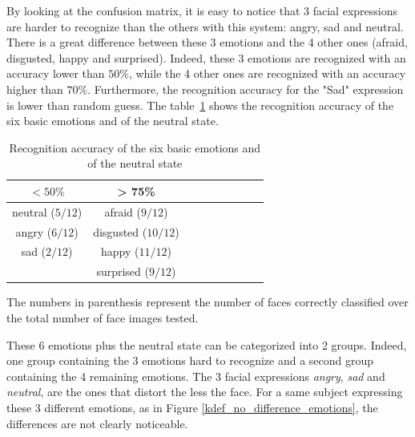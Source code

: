\noindent By looking at the confusion matrix, it is easy to notice that 3 facial expressions are harder to recognize than the others with this system: angry, sad and neutral. There is a great difference between these 3 emotions and the 4 other ones (afraid, disgusted, happy and surprised). Indeed, these 3 emotions are recognized with an accuracy lower than $ 50\% $, while the 4 other ones are recognized with an accuracy higher than $ 70\% $. Furthermore, the recognition accuracy for the "Sad" expression is lower than random guess. The table~\ref{table_results_accuracy} shows the recognition accuracy of the six basic emotions and of the neutral state.
\newline

\begin{table}[h]
   \caption{\label{table_results_accuracy} Recognition accuracy of the six basic emotions and of the neutral state}
\begin{tabular}{|c|c|c|c|c|c|c|c|c|}
  \hline
   $ < 50\% $ & > 75\% \\
  \hline
  neutral ($ 5/12 $) & afraid ($ 9/12 $) \\
  angry ($ 6/12 $) & disgusted ($ 10/12 $) \\
  sad ($ 2/12 $) & happy ($ 11/12 $) \\
   & surprised ($ 9/12 $) \\
  \hline
\end{tabular}
\end{table}

\noindent The numbers in parenthesis represent the number of faces correctly classified over the total number of face images tested.
\newline

\noindent These 6 emotions plus the neutral state can be categorized into 2 groups. Indeed, one group containing the 3 emotions hard to recognize and a second group containing the 4 remaining emotions. The 3 facial expressions \textit{angry}, \textit{sad} and \textit{neutral}, are the ones that distort the less the face. For a same subject expressing these 3 different emotions, as in Figure \ref{kdef_no_difference_emotions}, the differences are not clearly noticeable.
\newline

